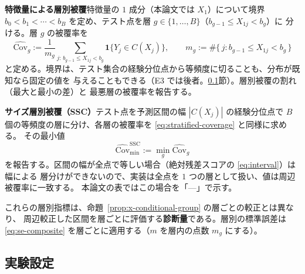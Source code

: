 \documentclass[a4paper,11pt]{jsarticle}
\theoremstyle{definition}
\theoremstyle{plain}
\theoremstyle{remark}
\newcommand{\Ind}{\mathbf{1}}                  %
\newcommand{\encircle}[1]{\textcircled{\scriptsize #1}}   %
\begin{document}
\textbf{特徴量による層別被覆}\quad 特徴量の $1$ 成分（本論文では $X_1$）について境界
$b_0<b_1<\cdots<b_B$ を定め、テスト点を層 $g\in\{1,\dots,B\}$（$b_{g-1}\le X_{1j}<b_g$）に
分ける。層 $g$ の被覆率を
\begin{equation}
  \label{eq:stratified-coverage}
  \widehat{\mathrm{Cov}}_g:=\frac{1}{m_g}\sum_{j:\,b_{g-1}\le X_{1j}<b_g}\Ind\bigl\{Y_j\in C(X_j)\bigr\},
  \qquad m_g:=\#\{\,j: b_{g-1}\le X_{1j}<b_g\,\}
\end{equation}
と定める。境界は、テスト集合の経験分位点から等頻度に切ることも、分布が既知なら固定の値を
与えることもできる（E3 では後者。\ref{sec:exp-setup}節）。層別被覆の割れ（最大と最小の差）と
最悪層の被覆率を報告する。

\textbf{サイズ層別被覆（SSC）}\quad テスト点を予測区間の幅 $|C(X_j)|$ の経験分位点で
$B$ 個の等頻度の層に分け、各層の被覆率を \eqref{eq:stratified-coverage} と同様に求める。
その最小値
\begin{equation}
  \label{eq:ssc}
  \widehat{\mathrm{Cov}}^{\mathrm{SSC}}_{\min}:=\min_{g}\widehat{\mathrm{Cov}}_g
\end{equation}
を報告する。区間の幅が全点で等しい場合（絶対残差スコアの \eqref{eq:interval}）は幅による
層分けができないので、実装は全点を $1$ つの層として扱い、値は周辺被覆率に一致する。
本論文の表ではこの場合を「---」で示す。

これらの層別指標は、命題~\ref{prop:x-conditional-group} の層ごとの較正とは異なり、
周辺較正した区間を層ごとに評価する\textbf{診断量}である。層別の標準誤差は
\eqref{eq:se-composite} を層ごとに適用する（$m$ を層内の点数 $m_g$ にする）。


\subsection{実験設定}
\label{sec:exp-setup}
\end{document}
